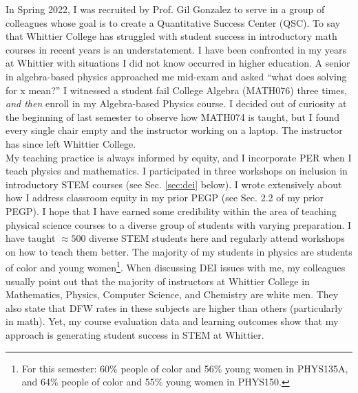 \documentclass[../../../main.tex]{subfiles}
\begin{document}
\label{sec:qsc}

In Spring 2022, I was recruited by Prof. Gil Gonzalez to serve in a group of colleagues whose goal is to create a Quantitative Success Center (QSC).  To say that Whittier College has struggled with student success in introductory math courses in recent years is an understatement.  I have been confronted in my years at Whittier with situations I did not know occurred in higher education.  A senior in algebra-based physics approached me mid-exam and asked ``what does solving for x mean?'' I witnessed a student fail College Algebra (MATH076) three times, \textit{and then} enroll in my Algebra-based Physics course.  I decided out of curiosity at the beginning of last semester to observe how MATH074 is taught, but I found every single chair empty and the instructor working on a laptop.  The instructor has since left Whittier College.
\\
\vspace{0.15cm}
My teaching practice is always informed by equity, and I incorporate PER when I teach physics and mathematics.  I participated in three workshops on inclusion in introductory STEM courses (see Sec. \ref{sec:dei} below).  I wrote extensively about how I address classroom equity in my prior PEGP (see Sec. 2.2 of my prior PEGP).  I hope that I have earned some credibility within the area of teaching physical science courses to a diverse group of students with varying preparation.  I have taught $\approx 500$ diverse STEM students here and regularly attend workshops on how to teach them better.  The majority of my students in physics are students of color and young women\footnote{For this semester: 60\% people of color and 56\% young women in PHYS135A, and 64\% people of color and 55\% young women in PHYS150.}.  When discussing DEI issues with me, my colleagues usually point out that the majority of instructors at Whittier College in Mathematics, Physics, Computer Science, and Chemistry are white men.  They also state that DFW rates in these subjects are higher than others (particularly in math).  Yet, my course evaluation data and learning outcomes show that my approach is generating student success in STEM at Whittier.
\\
\vspace{0.15cm}
\end{document}
